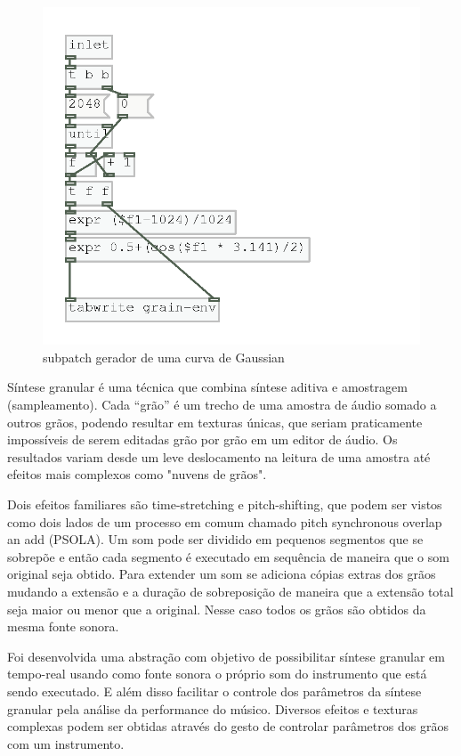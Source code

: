 \documentclass{ppgmus}
\begin{document}
\begin{figure}
\includegraphics[scale=.6]{granular3}
\caption{subpatch gerador de uma curva de Gaussian}
\label{granular3}
\end{figure}

Síntese granular é uma técnica que combina síntese aditiva e amostragem (sampleamento).
Cada ``grão'' é um trecho de uma amostra de áudio somado a outros grãos, podendo
resultar em texturas únicas, que seriam praticamente impossíveis de serem editadas
grão por grão em um editor de áudio. Os resultados variam desde um leve deslocamento na leitura
de uma amostra até efeitos mais complexos como "nuvens de grãos".

Dois efeitos familiares são time-stretching e pitch-shifting, que podem ser vistos
como dois lados de um processo em comum chamado pitch synchronous overlap an add (PSOLA).
Um som pode ser dividido em pequenos segmentos que se sobrepõe e então cada segmento
é executado em sequência de maneira que o som original seja obtido. Para extender um
som se adiciona cópias extras dos grãos mudando a extensão e a duração de sobreposição
de maneira que a extensão total seja maior ou menor que a original. Nesse caso todos os 
grãos são obtidos da mesma fonte sonora.

Foi desenvolvida uma abstração com objetivo de possibilitar síntese granular em tempo-real usando como
fonte sonora o próprio som do instrumento que está sendo executado. E além
disso facilitar o controle dos parâmetros da síntese granular pela análise
da performance do músico. Diversos efeitos e texturas complexas podem ser obtidas
através do gesto de controlar parâmetros dos grãos com um instrumento.
\end{document}
